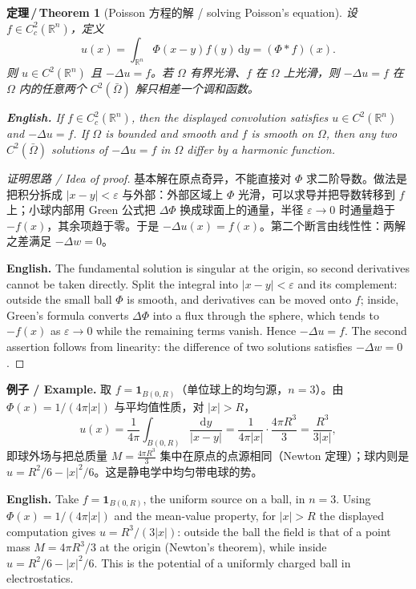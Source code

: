 \documentclass[UTF8,11pt,a4paper]{ctexart}
\newcommand{\EN}[1]{\par\noindent \textbf{English.} #1\par}
\newcommand{\EX}[2]{\par\noindent \textbf{例子 / Example.} #1\par\EN{#2}}
\newtheorem{theorem}[definition]{定理\,/\,Theorem}
\newcommand{\R}{\mathbb{R}}
\newcommand{\dd}{\mathrm{d}}
\begin{document}
\begin{theorem}[Poisson 方程的解 / solving Poisson's equation]\label{thm:poisson}
设 $f\in C^2_c(\R^n)$，定义
\[
u(x)=\int_{\R^n}\Phi(x-y)f(y)\,\dd y=(\Phi*f)(x).
\]
则 $u\in C^2(\R^n)$ 且 $-\Delta u=f$。若 $\Omega$ 有界光滑、$f$ 在 $\Omega$ 上光滑，则 $-\Delta u=f$ 在 $\Omega$ 内的任意两个 $C^2(\bar\Omega)$ 解只相差一个调和函数。
\EN{If $f\in C^2_c(\R^n)$, then the displayed convolution satisfies $u\in C^2(\R^n)$ and $-\Delta u=f$. If $\Omega$ is bounded and smooth and $f$ is smooth on $\Omega$, then any two $C^2(\bar\Omega)$ solutions of $-\Delta u=f$ in $\Omega$ differ by a harmonic function.}
\end{theorem}

\begin{proof}[证明思路 / Idea of proof]
基本解在原点奇异，不能直接对 $\Phi$ 求二阶导数。做法是把积分拆成 $|x-y|<\varepsilon$ 与外部：外部区域上 $\Phi$ 光滑，可以求导并把导数转移到 $f$ 上；小球内部用 Green 公式把 $\Delta\Phi$ 换成球面上的通量，半径 $\varepsilon\to0$ 时通量趋于 $-f(x)$，其余项趋于零。于是 $-\Delta u(x)=f(x)$。第二个断言由线性性：两解之差满足 $-\Delta w=0$。\EN{The fundamental solution is singular at the origin, so second derivatives cannot be taken directly. Split the integral into $|x-y|<\varepsilon$ and its complement: outside the small ball $\Phi$ is smooth, and derivatives can be moved onto $f$; inside, Green's formula converts $\Delta\Phi$ into a flux through the sphere, which tends to $-f(x)$ as $\varepsilon\to0$ while the remaining terms vanish. Hence $-\Delta u=f$. The second assertion follows from linearity: the difference of two solutions satisfies $-\Delta w=0$.}
\end{proof}

\EX{取 $f=\mathbf 1_{B(0,R)}$（单位球上的均匀源，$n=3$）。由 $\Phi(x)=1/(4\pi|x|)$ 与平均值性质，对 $|x|>R$，
\[
u(x)=\frac{1}{4\pi}\int_{B(0,R)}\frac{\dd y}{|x-y|}=\frac{1}{4\pi|x|}\cdot\frac{4\pi R^3}{3}=\frac{R^3}{3|x|},
\]
即球外场与把总质量 $M=\frac{4\pi R^3}{3}$ 集中在原点的点源相同（Newton 定理）；球内则是 $u=R^2/6-|x|^2/6$。这是静电学中均匀带电球的势。}{Take $f=\mathbf 1_{B(0,R)}$, the uniform source on a ball, in $n=3$. Using $\Phi(x)=1/(4\pi|x|)$ and the mean-value property, for $|x|>R$ the displayed computation gives $u=R^3/(3|x|)$: outside the ball the field is that of a point mass $M=4\pi R^3/3$ at the origin (Newton's theorem), while inside $u=R^2/6-|x|^2/6$. This is the potential of a uniformly charged ball in electrostatics.}
\end{document}
